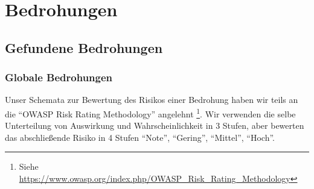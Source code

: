 \documentclass[12pt,DIV14,BCOR10mm,a4paper,parskip=half-,headsepline,headinclude,english,ngerman,bibliography=totocnumbered]{scrreprt}
\begin{document}
\chapter{Bedrohungen}
\section{Gefundene Bedrohungen}

\subsection{Globale Bedrohungen}

Unser Schemata zur Bewertung des Risikos einer Bedrohung haben wir teils an die \enquote{OWASP Risk Rating Methodology} angelehnt \footnote{Siehe \url{https://www.owasp.org/index.php/OWASP_Risk_Rating_Methodology}}. Wir verwenden die selbe Unterteilung von Auswirkung und Wahrscheinlichkeit in 3 Stufen, aber bewerten das abschließende Risiko in 4 Stufen \enquote{Note}, \enquote{Gering}, \enquote{Mittel}, \enquote{Hoch}.
\end{document}
